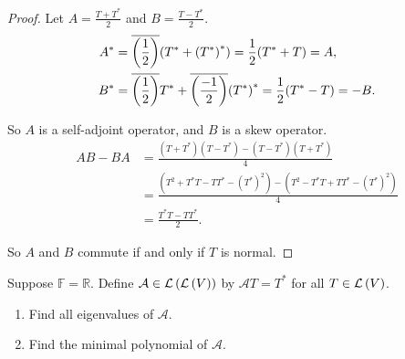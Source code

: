 \begin{proof}
    Let $A = \frac{T + T^{*}}{2}$ and $B = \frac{T - T^{*}}{2}$.
    \begin{align*}
        A^{*} & = \overline{\left(\frac{1}{2}\right)}(T^{*} + {(T^{*})}^{*}) = \frac{1}{2}(T^{*} + T) = A,                                \\
        B^{*} & = \overline{\left(\frac{1}{2}\right)}T^{*} + \overline{\left(\frac{-1}{2}\right)}{(T^{*})}^{*} = \frac{1}{2}(T^{*} - T) = -B.
    \end{align*}

    So $A$ is a self-adjoint operator, and $B$ is a skew operator.
    \begin{align*}
        AB - BA & = \frac{(T + T^{*})(T - T^{*}) - (T - T^{*})(T + T^{*})}{4}                                       \\
                & = \frac{(T^{2} + T^{*}T - TT^{*} - {(T^{*})}^{2}) - (T^{2} - T^{*}T + TT^{*} - {(T^{*})}^{2})}{4} \\
                & = \frac{T^{*}T - TT^{*}}{2}.
    \end{align*}

    So $A$ and $B$ commute if and only if $T$ is normal.
\end{proof}
\newpage

\begin{exercise}
    Suppose $\mathbb{F} = \mathbb{R}$. Define $\mathcal{A}\in \mathcal{L}\left({\mathcal{L}\left({V}\right)}\right)$ by $\mathcal{A}T = T^{*}$ for all $T\in\mathcal{L}\left({V}\right)$.
    \begin{enumerate}[label={(\alph*)}]
        \item Find all eigenvalues of $\mathcal{A}$.
        \item Find the minimal polynomial of $\mathcal{A}$.
    \end{enumerate}
\end{exercise}

